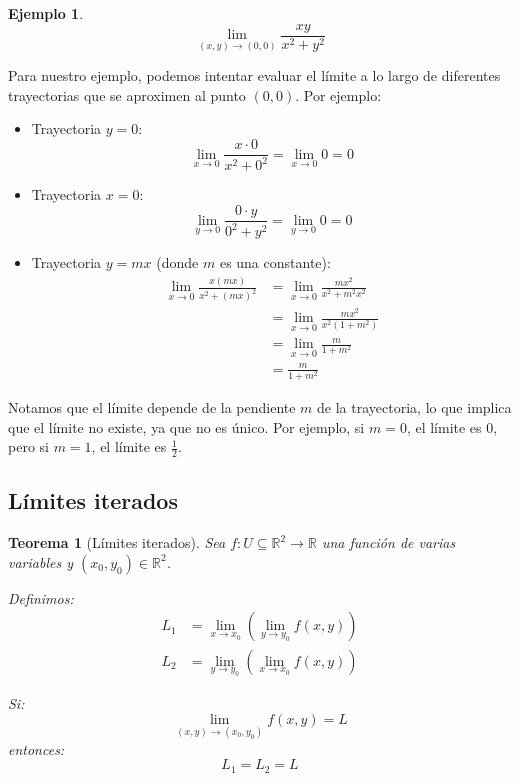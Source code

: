 \documentclass{article}
\newcommand{\R}{\mathbb{R}}
\theoremstyle{definition}
\newtheorem{example}[definition]{Ejemplo}
\theoremstyle{plain}
\newtheorem{theorem}[definition]{Teorema}
\theoremstyle{remark}
\theoremstyle{corollary}
\begin{document}
\begin{example}
\[
\lim_{(x, y) \to (0, 0)} \frac{xy}{x^2 + y^2}
\]
\end{example}

Para nuestro ejemplo, podemos intentar evaluar el límite a lo largo de diferentes trayectorias que se aproximen al punto $(0, 0)$. Por ejemplo:

\begin{itemize}
\item Trayectoria $y = 0$:
\[
\lim_{x \to 0} \frac{x \cdot 0}{x^2 + 0^2} = \lim_{x \to 0} 0 = 0
\]
\item Trayectoria $x = 0$:
\[
\lim_{y \to 0} \frac{0 \cdot y}{0^2 + y^2} = \lim_{y \to 0} 0 = 0
\]
\item Trayectoria $y = mx$ (donde $m$ es una constante):
\begin{align*}
\lim_{x \to 0} \frac{x(mx)}{x^2 + (mx)^2} &= \lim_{x \to 0} \frac{mx^2}{x^2 + m^2 x^2} \\
&= \lim_{x \to 0} \frac{mx^2}{x^2(1 + m^2)} \\
&= \lim_{x \to 0} \frac{m}{1 + m^2} \\
&= \boxed{\frac{m}{1 + m^2}}
\end{align*}

\end{itemize}

Notamos que el límite depende de la pendiente $m$ de la trayectoria, lo que implica que el límite no existe, ya que no es único. Por ejemplo, si $m = 0$, el límite es $0$, pero si $m = 1$, el límite es $\frac{1}{2}$.

\subsection{Límites iterados}

\begin{theorem}[Límites iterados]
Sea $f : U \subseteq \R^2 \to \R$ una función de varias variables y $(x_0, y_0) \in \R^2$.

Definimos:
\begin{align*}
L_1 &= \lim_{x \to x_0} \left( \lim_{y \to y_0} f(x, y) \right) \\
L_2 &= \lim_{y \to y_0} \left( \lim_{x \to x_0} f(x, y) \right)
\end{align*}

Si:
\[
\lim_{(x, y) \to (x_0, y_0)} f(x, y) = L
\]
entonces:
\[
L_1 = L_2 = L
\]

\end{theorem}
\end{document}
